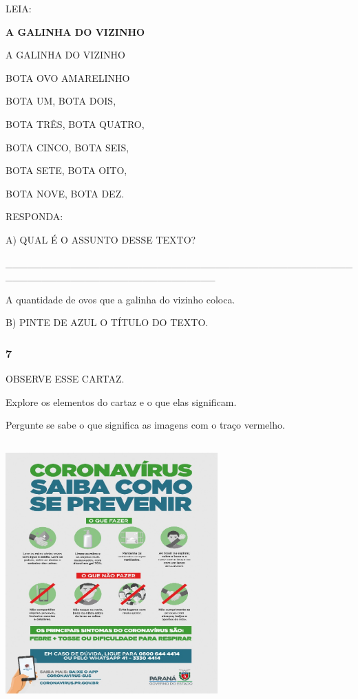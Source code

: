 LEIA:

\textbf{A GALINHA DO VIZINHO}

A GALINHA DO VIZINHO

BOTA OVO AMARELINHO

BOTA UM, BOTA DOIS,

BOTA TRÊS, BOTA QUATRO,

BOTA CINCO, BOTA SEIS,

BOTA SETE, BOTA OITO,

BOTA NOVE, BOTA DEZ.

RESPONDA:

A) QUAL É O ASSUNTO DESSE TEXTO?

\_\_\_\_\_\_\_\_\_\_\_\_\_\_\_\_\_\_\_\_\_\_\_\_\_\_\_\_\_\_\_\_\_\_\_\_\_\_\_\_\_\_\_\_\_\_\_\_\_\_\_\_\_\_\_\_\_\_\_\_\_\_\_\_\_\_\_\_\_\_\_\_\_\_\_\_\_

A quantidade de ovos que a galinha do vizinho coloca.

B) PINTE DE AZUL O TÍTULO DO TEXTO.

\subsubsection{7 }\label{section-61}

OBSERVE ESSE CARTAZ.

Explore os elementos do cartaz e o que elas significam.

Pergunte se sabe o que significa as imagens com o traço vermelho.

\includegraphics[width=3.20896in,height=3.98057in]{media/image120.jpeg}

